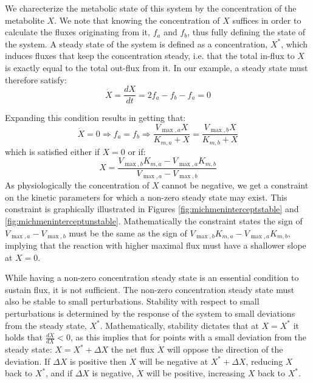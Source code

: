 \documentclass[a4page,notitlepage]{article}
\begin{document}
    We charecterize the metabolic state of this system by the concentration of the metabolite $X$.
    We note that knowing the concentration of $X$ suffices in order to calculate the fluxes originating from it, $f_a$ and $f_b$, thus fully defining the state of the system.
    A steady state of the system is defined as a concentration, $X^*$, which induces fluxes that keep the concentration steady, i.e. that the total in-flux to $X$ is exactly equal to the total out-flux from it.
    In our example, a steady state must therefore satisfy:
    \begin{equation*}
      \dot X = \frac{dX}{dt} = 2f_a - f_b - f_a = 0
    \end{equation*}

    Expanding this condition results in getting that:
    \begin{equation*}
      \dot X = 0 \Rightarrow f_a = f_b \Rightarrow \frac{V_{\max,a}X}{K_{m,a}+X}=\frac{V_{\max,b}X}{K_{m,b}+X}
    \end{equation*}
    which is satisfied either if $X=0$ or if:
    \begin{equation*}
      X=\frac{V_{\max,b}K_{m,a}-V_{\max,a}K_{m,b}}{V_{\max,a}-V_{\max,b}}
    \end{equation*}
    As physiologically the concentration of $X$ cannot be negative, we get a constraint on the kinetic parameters for which a non-zero steady state may exist.
    This constraint is graphically illustrated in Figures \ref{fig:michmeninterceptstable} and \ref{fig:michmeninterceptunstable}.
    Mathematically the constraint states the sign of $V_{\max,a}-V_{\max,b}$ must be the same as the sign of $V_{\max,b}K_{m,a}-V_{\max,a}K_{m,b}$, implying that the reaction with higher maximal flux must have a shallower slope at $X=0$.

    While having a non-zero concentration steady state is an essential condition to sustain flux, it is not sufficient.
    The non-zero concentration steady state must also be stable to small perturbations.
    Stability with respect to small perturbations is determined by the response of the system to small deviations from the steady state, $X^*$.
    Mathematically, stability dictates that at $X=X^*$ it holds that $\frac{d\dot X}{dX} <0$, as this  implies that for points with a small deviation from the steady state: $X = X^*+\Delta X$ the net flux $\dot X$ will oppose the direction of the deviation.
    If $\Delta X$ is positive then $\dot X$ will be negative at $X^*+\Delta X$, reducing $X$ back to $X^*$, and if $\Delta X$ is negative, $\dot X$ will be positive, increasing $X$ back to $X^*$.
\end{document}
